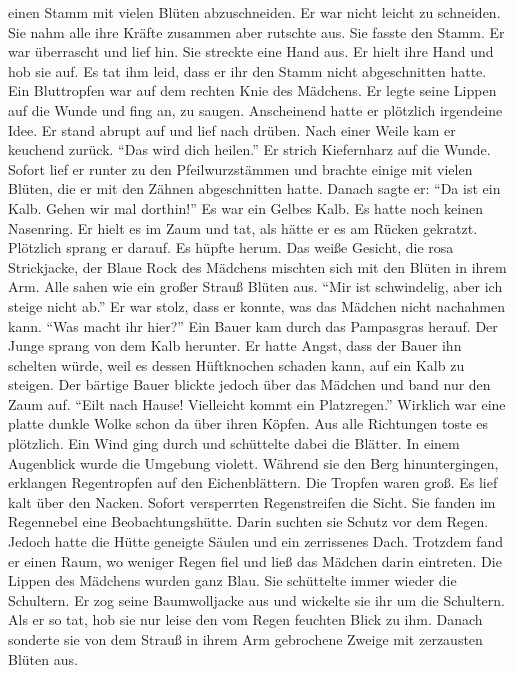 \documentclass[prd,12pt,tightenlines,notitlepage,nofootinbib]{revtex4-1}
\begin{document}
einen Stamm mit vielen Blüten abzuschneiden.  Er war nicht leicht
zu schneiden.  Sie nahm alle ihre Kräfte zusammen aber rutschte aus.
Sie fasste den Stamm.  Er war überrascht und lief hin.  Sie streckte
eine Hand aus.  Er hielt ihre Hand und hob sie auf.  Es tat ihm leid,
dass er ihr den Stamm nicht abgeschnitten hatte.  Ein Bluttropfen war auf
dem rechten Knie des Mädchens.  Er legte seine Lippen auf die Wunde und fing an,
zu saugen.  Anscheinend hatte er plötzlich irgendeine Idee.  Er stand abrupt auf
und lief nach drüben.  Nach einer Weile kam er keuchend zurück.  "`Das
wird dich heilen."'  Er strich Kiefernharz auf die Wunde.  Sofort
lief er runter zu den Pfeilwurzstämmen und brachte einige mit vielen
Blüten, die er mit den Zähnen abgeschnitten hatte.  Danach sagte er: "`Da ist ein Kalb.
Gehen wir mal dorthin!"'  Es war ein Gelbes Kalb.  Es hatte noch keinen
Nasenring.  Er hielt es im Zaum und tat, als hätte er es am Rücken
gekratzt.  Plötzlich sprang er darauf.  Es hüpfte herum.
Das weiße Gesicht, die rosa Strickjacke, der Blaue Rock des
Mädchens mischten sich mit den Blüten in ihrem Arm.  Alle sahen wie
ein großer Strauß Blüten aus.  "`Mir ist schwindelig, aber ich steige nicht
ab."'  Er war stolz, dass er konnte, was das Mädchen nicht nachahmen kann.
"`Was macht ihr hier?"'  Ein Bauer kam durch das Pampasgras herauf.  Der
Junge sprang von dem Kalb herunter.  Er hatte Angst, dass der Bauer ihn schelten
würde, weil es dessen Hüftknochen schaden kann, auf ein Kalb zu steigen.  Der
bärtige Bauer blickte jedoch über das Mädchen und band nur den Zaum
auf.  "`Eilt nach Hause!  Vielleicht kommt ein Platzregen."'  Wirklich
war eine platte dunkle Wolke schon da über ihren Köpfen. Aus alle
Richtungen toste es plötzlich.  Ein Wind ging durch und
schüttelte dabei die Blätter.  In einem Augenblick wurde die Umgebung violett.
Während sie den Berg hinuntergingen, erklangen Regentropfen
auf den Eichenblättern.
Die Tropfen waren groß.  Es lief kalt über den Nacken. %
Sofort versperrten Regenstreifen die Sicht.  Sie fanden im
Regennebel eine Beobachtungshütte.  Darin suchten sie Schutz vor dem Regen.
Jedoch hatte die Hütte geneigte Säulen und ein zerrissenes
Dach.  Trotzdem fand er einen Raum, wo weniger Regen fiel und ließ das Mädchen
darin eintreten.  Die Lippen des Mädchens wurden ganz Blau.
Sie schüttelte immer wieder die Schultern.  Er zog seine Baumwolljacke
aus und wickelte sie ihr um die Schultern.  Als er so tat, hob sie nur
leise den vom Regen feuchten Blick zu ihm.  Danach sonderte sie von dem
Strauß in ihrem Arm gebrochene Zweige mit zerzausten Blüten aus.
\end{document}
